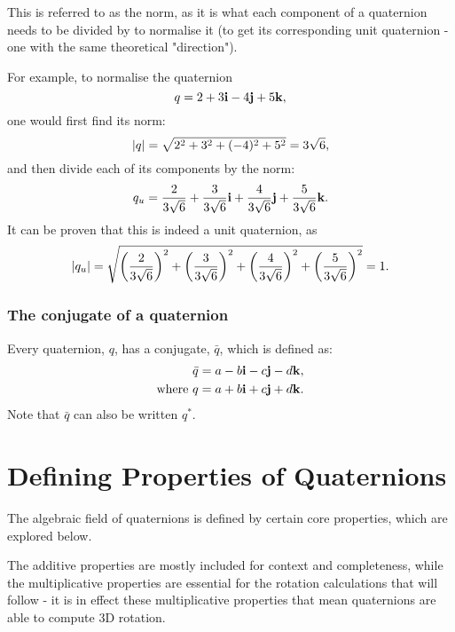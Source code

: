 \documentclass[10pt]{article}
\begin{document}
This is referred to as the norm, as it is what each component of a quaternion needs to be divided by to normalise it (to get its corresponding unit quaternion - one with the same theoretical "direction").

For example, to normalise the quaternion
\begin{equation}
    q = 2 + 3\vb{i} - 4\vb{j} + 5\vb{k},
\end{equation}
one would first find its norm:
\begin{equation}
    \abs{q} = \sqrt{2^2 + 3^2 + (-4)^2 + 5^2} = 3\sqrt{6},
\end{equation}
and then divide each of its components by the norm:
\begin{equation}
    q_u = \frac{2}{3\sqrt{6}}+\frac{3}{3\sqrt{6}}\vb{i}+\frac{4}{3\sqrt{6}}\vb{j}+\frac{5}{3\sqrt{6}}\vb{k}.
\end{equation}
It can be proven that this is indeed a unit quaternion, as
\begin{equation}
    \abs{q_u} = \sqrt{\left(\frac{2}{3\sqrt{6}}\right)^2+\left(\frac{3}{3\sqrt{6}}\right)^2+\left(\frac{4}{3\sqrt{6}}\right)^2+\left(\frac{5}{3\sqrt{6}}\right)^2} = 1.
\end{equation}

\subsubsection{The conjugate of a quaternion}

Every quaternion, $q$, has a conjugate, $\bar{q}$, which is defined as:
\begin{equation}
    \begin{aligned}
        &\bar{q} = a - b\vb{i} - c\vb{j} - d\vb{k}, \\
        \text{where } & q = a + b\vb{i} + c\vb{j} + d\vb{k}.
    \end{aligned}
\end{equation}
Note that $\bar{q}$ can also be written $q^*$. \cite{DRose}

\pagebreak
\section{Defining Properties of Quaternions}

The algebraic field of quaternions is defined by certain core properties, which are explored below.

The additive properties are mostly included for context and completeness, while the multiplicative properties are essential for the rotation calculations that will follow - it is in effect these multiplicative properties that mean quaternions are able to compute 3D rotation.
\end{document}
